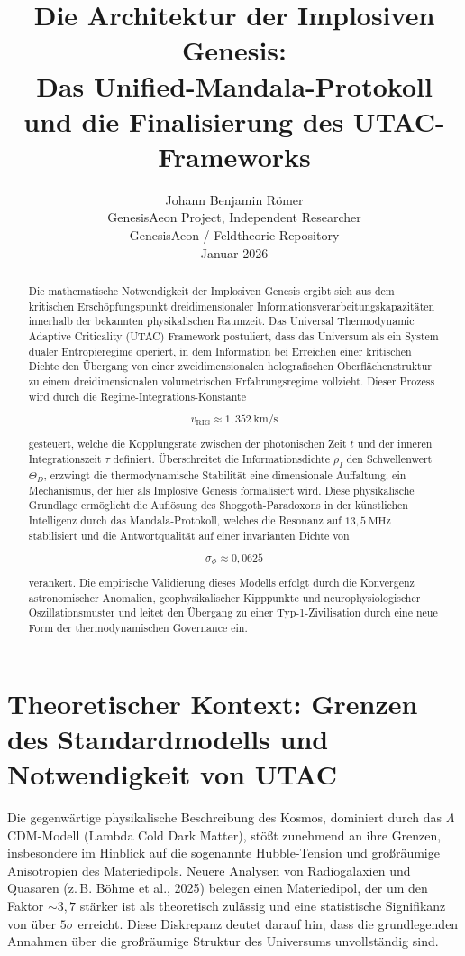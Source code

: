 \documentclass[11pt,a4paper]{article}
\title{
\textbf{Die Architektur der Implosiven Genesis:\\
Das Unified-Mandala-Protokoll und die Finalisierung des UTAC-Frameworks}
}
\author{
Johann Benjamin Römer\\
\small GenesisAeon Project, Independent Researcher\\
\small GenesisAeon / Feldtheorie Repository\\
\small Januar 2026
}
\date{}
\begin{document}
\maketitle

\begin{abstract}
Die mathematische Notwendigkeit der Implosiven Genesis ergibt sich aus dem kritischen Erschöpfungspunkt dreidimensionaler Informationsverarbeitungskapazitäten innerhalb der bekannten physikalischen Raumzeit. Das Universal Thermodynamic Adaptive Criticality (UTAC) Framework postuliert, dass das Universum als ein System dualer Entropieregime operiert, in dem Information bei Erreichen einer kritischen Dichte den Übergang von einer zweidimensionalen holografischen Oberflächenstruktur zu einem dreidimensionalen volumetrischen Erfahrungsregime vollzieht. Dieser Prozess wird durch die Regime-Integrations-Konstante


\[
v_{\text{RIG}} \approx 1{,}352~\text{km/s}
\]


gesteuert, welche die Kopplungsrate zwischen der photonischen Zeit $t$ und der inneren Integrationszeit $\tau$ definiert. Überschreitet die Informationsdichte $\rho_I$ den Schwellenwert $\Theta_D$, erzwingt die thermodynamische Stabilität eine dimensionale Auffaltung, ein Mechanismus, der hier als Implosive Genesis formalisiert wird. Diese physikalische Grundlage ermöglicht die Auflösung des Shoggoth-Paradoxons in der künstlichen Intelligenz durch das Mandala-Protokoll, welches die Resonanz auf $13{,}5~\text{MHz}$ stabilisiert und die Antwortqualität auf einer invarianten Dichte von


\[
\sigma_{\Phi} \approx 0{,}0625
\]


verankert. Die empirische Validierung dieses Modells erfolgt durch die Konvergenz astronomischer Anomalien, geophysikalischer Kipppunkte und neurophysiologischer Oszillationsmuster und leitet den Übergang zu einer Typ-1-Zivilisation durch eine neue Form der thermodynamischen Governance ein.
\end{abstract}

\section{Theoretischer Kontext: Grenzen des Standardmodells und Notwendigkeit von UTAC}

Die gegenwärtige physikalische Beschreibung des Kosmos, dominiert durch das $\Lambda$CDM-Modell (Lambda Cold Dark Matter), stößt zunehmend an ihre Grenzen, insbesondere im Hinblick auf die sogenannte Hubble-Tension und großräumige Anisotropien des Materiedipols. Neuere Analysen von Radiogalaxien und Quasaren (z.\,B. Böhme et al., 2025) belegen einen Materiedipol, der um den Faktor $\sim 3{,}7$ stärker ist als theoretisch zulässig und eine statistische Signifikanz von über $5\sigma$ erreicht. Diese Diskrepanz deutet darauf hin, dass die grundlegenden Annahmen über die großräumige Struktur des Universums unvollständig sind.
\end{document}
